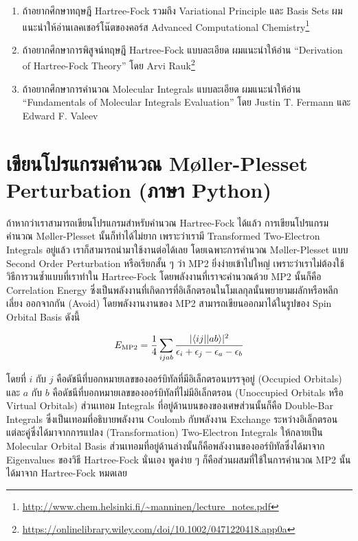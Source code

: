 \begin{enumerate}[topsep=0pt,noitemsep]
  \setlength\itemsep{1em}
  \item ถ้าอยากศึกษาทฤษฎี Hartree-Fock รวมถึง Variational Principle และ Basis Sets ผมแนะนำให้อ่านเลคเชอร์โน๊ตของคอร์ส
        Advanced Computational Chemistry\footnote{\url{http://www.chem.helsinki.fi/~manninen/lecture_notes.pdf}}

  \item ถ้าอยากศึกษาการพิสูจน์ทฤษฎี Hartree-Fock แบบละเอียด ผมแนะนำให้อ่าน \enquote{Derivation of Hartree-Fock Theory}
        โดย Arvi Rauk\footnote{\url{https://onlinelibrary.wiley.com/doi/10.1002/0471220418.app0a}}

  \item ถ้าอยากศึกษาการคำนวณ Molecular Integrals แบบละเอียด ผมแนะนำให้อ่าน \enquote{Fundamentals of Molecular
          Integrals Evaluation} โดย Justin T. Fermann และ Edward F. Valeev
\end{enumerate}

\section{เขียนโปรแกรมคำนวณ M\o{}ller-Plesset Perturbation (ภาษา Python)}

ถ้าหากว่าเราสามารถเขียนโปรแกรมสำหรับคำนวณ Hartree-Fock ได้แล้ว การเขียนโปรแกรมคำนวณ M\o{}ller-Plesset นั้นก็ทำได้ไม่ยาก
เพราะว่าเรามี Transformed Two-Electron Integrals อยู่แล้ว เราก็สามารถนำมาใช้งานต่อได้เลย โดยเฉพาะการคำนวณ M\o{}ller-Plesset
แบบ Second Order Perturbation หรือเรียกสั้น ๆ ว่า MP2 ยิ่งง่ายเข้าไปใหญ่ เพราะว่าเราไม่ต้องใช้วิธีการวนซ้ำแบบที่เราทำใน Hartree-Fock
โดยพลังงานที่เราจะคำนวณด้วย MP2 นั้นก็คือ Correlation Energy ซึ่งเป็นพลังงานที่เกิดการที่อิเล็กตรอนในโมเลกุลนั้นพยายามผลักหรือหลีกเลี่ยง%
ออกจากกัน (Avoid) โดยพลังงานงานของ MP2 สามารถเขียนออกมาได้ในรูปของ Spin Orbital Basis ดังนี้

\begin{equation}
  E_{\rm MP2}
  =
  \frac{1}{4}
  \sum_{ijab}
  \frac{
    \vert \langle ij \vert \vert ab \rangle\vert ^2
  }{
    \epsilon_i+\epsilon_j-\epsilon_a-\epsilon_b
  }
\end{equation}

\noindent โดยที่ $i$ กับ $j$ คือดัชนีที่บอกหมายเลขของออร์บิทัลที่มีอิเล็กตรอนบรรจุอยู่ (Occupied Orbitals) และ $a$ กับ $b$
คือดัชนีที่บอกหมายเลขของออร์บิทัลที่ไม่มีอิเล็กตรอน (Unoccupied Orbitals หรือ Virtual Orbitals) ส่วนเทอม Integrals
ที่อยู่ด้านบนของของเศษส่วนนั้นก็คือ Double-Bar Integrals ซึ่งเป็นเทอมที่อธิบายพลังงาน Coulomb กับพลังงาน Exchange
ระหว่างอิเล็กตรอนแต่ละคู่ซึ่งได้มาจากการแปลง (Transformation) Two-Electron Integrals ให้กลายเป็น Molecular Orbital Basis
ส่วนเทอมที่อยู่ด้านล่างนั้นก็คือพลังงานของออร์บิทัลซึ่งได้มาจาก Eigenvalues ของวิธี Hartree-Fock นั่นเอง พูดง่าย ๆ ก็คือส่วนผสมที่ใช้ในการคำนวณ
MP2 นั้นได้มาจาก Hartree-Fock หมดเลย

